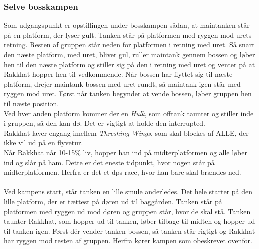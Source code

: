 \subsubsection*{Selve bosskampen}
Som udgangspunkt er opstillingen under bosskampen sådan, at maintanken står på
en platform, der lyser gult. Tanken står på platformen med ryggen mod urets
retning. Resten af gruppen står neden for platformen i retning med uret. Så
snart den næste platform, med uret, bliver gul, ruller maintank gennem bossen
og løber hen til den næste platform og stiller sig på den i retning med uret
og venter på at Rakkhat hopper hen til vedkommende. Når bossen har flyttet sig
til næste platform, drejer maintank bossen med uret rundt, så maintank igen
står med ryggen mod uret. Først når tanken begynder at vende bossen, løber
gruppen hen til næste position. \\
Ved hver anden platform kommer der en
\emph{Hulk}, som offtank taunter og stiller inde i gruppen, så den kan dø. Det
er vigtigt at holde den interrupted.\\
Rakkhat laver engang imellem \emph{Threshing Wings}, som skal blockes af ALLE,
der ikke vil ud på en flyvetur.\\
Når Rakkhat når 10-15\% liv, hopper han ind på midterplatformen og alle løber
ind og slår på ham. Dette er det eneste tidpunkt, hvor nogen står på
midterplatformen. Herfra er det et dps-race, hvor han bare skal brændes ned.\\
\\
Ved kampens start, står tanken en lille smule anderledes. Det hele starter på
den lille platform, der er tættest på døren ud til baggården. Tanken står på
platformen med ryggen ud mod døren og gruppen står, hvor de skal stå. Tanken
taunter Rakkhat, som hopper ud til tanken, løber tilbage til midten og hopper
ud til tanken igen. Først dér vender tanken bossen, så tanken står rigtigt og
Rakkhat har ryggen mod resten af gruppen. Herfra kører kampen som obeskrevet
ovenfor.
